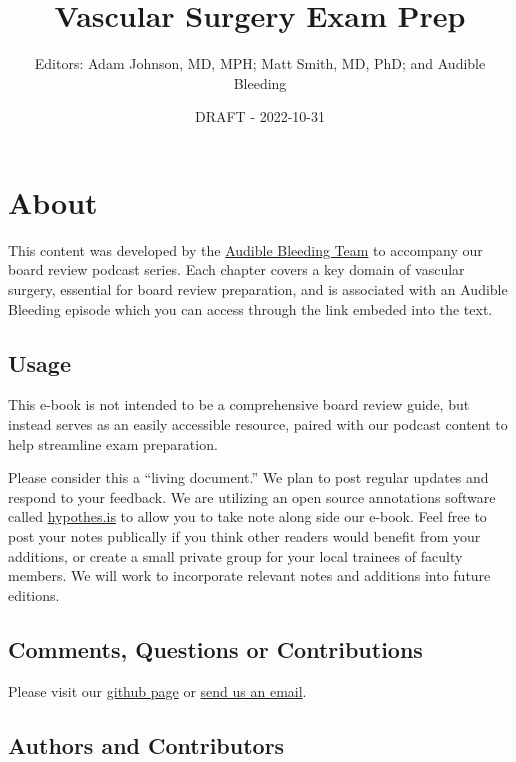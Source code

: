 \documentclass[
]{book}
\title{Vascular Surgery Exam Prep}
\author{Editors: Adam Johnson, MD, MPH; Matt Smith, MD, PhD; and Audible Bleeding}
\date{DRAFT - 2022-10-31}
\begin{document}
\maketitle

{
\setcounter{tocdepth}{1}
\tableofcontents
}
\hypertarget{about}{%
\chapter{About}\label{about}}

This content was developed by the \href{https://www.audiblebleeding.com/about-1/}{Audible Bleeding Team} to accompany our board review podcast series. Each chapter covers a key domain of vascular surgery, essential for board review preparation, and is associated with an Audible Bleeding episode which you can access through the link embeded into the text.

\hypertarget{usage}{%
\section{Usage}\label{usage}}

This e-book is not intended to be a comprehensive board review guide, but instead serves as an easily accessible resource, paired with our podcast content to help streamline exam preparation.

Please consider this a ``living document.'' We plan to post regular updates and respond to your feedback. We are utilizing an open source annotations software called \href{https://web.hypothes.is}{hypothes.is} to allow you to take note along side our e-book. Feel free to post your notes publically if you think other readers would benefit from your additions, or create a small private group for your local trainees of faculty members. We will work to incorporate relevant notes and additions into future editions.

\hypertarget{comments-questions-or-contributions}{%
\section{Comments, Questions or Contributions}\label{comments-questions-or-contributions}}

Please visit our \href{https://github.com/adam-mdmph/VS-Exam-Prep}{github page} or \href{mailto:audiblebleeding@vascularsociety.org}{send us an email}.

\hypertarget{authors-and-contributors}{%
\section{Authors and Contributors}\label{authors-and-contributors}}
\end{document}
